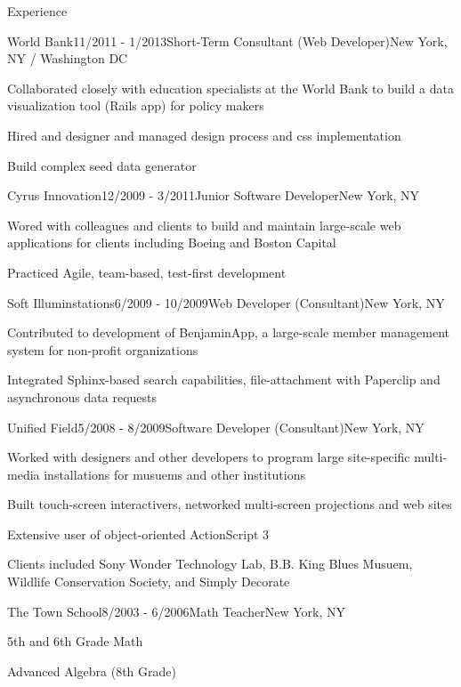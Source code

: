 \documentclass{resume} %
\begin{document}
\begin{rSection}{Experience}
\clearpage

\begin{rSubsection}{World Bank}{11/2011 - 1/2013}{Short-Term Consultant (Web Developer)}{New York, NY / Washington DC}
\item Collaborated closely with education specialists at the World Bank to build a data visualization tool (Rails app) for policy makers
\item Hired and designer and managed design process and css implementation
\item Build complex seed data generator
\end{rSubsection}

\begin{rSubsection}{Cyrus Innovation}{12/2009 - 3/2011}{Junior Software Developer}{New York, NY}
\item Wored with colleagues and clients to build and maintain large-scale web applications for clients including Boeing and Boston Capital
\item Practiced Agile, team-based, test-first development
\end{rSubsection}

\begin{rSubsection}{Soft Illuminstations}{6/2009 - 10/2009}{Web Developer (Consultant)}{New York, NY}
\item Contributed to development of BenjaminApp, a large-scale member management system for non-profit organizations
\item Integrated Sphinx-based search capabilities, file-attachment with Paperclip and asynchronous data requests
\end{rSubsection}

\begin{rSubsection}{Unified Field}{5/2008 - 8/2009}{Software Developer (Consultant)}{New York, NY}
\item Worked with designers and other developers to program large site-specific multi-media installations for musuems and other institutions
\item Built touch-screen interactivers, networked multi-screen projections and web sites
\item Extensive user of object-oriented ActionScript 3
\item Clients included Sony Wonder Technology Lab, B.B. King Blues Musuem, Wildlife Conservation Society, and Simply Decorate
\end{rSubsection}

\begin{rSubsection}{The Town School}{8/2003 - 6/2006}{Math Teacher}{New York, NY}
\item 5th and 6th Grade Math
\item Advanced Algebra (8th Grade)
\end{rSubsection}


\end{rSection}
\end{document}
